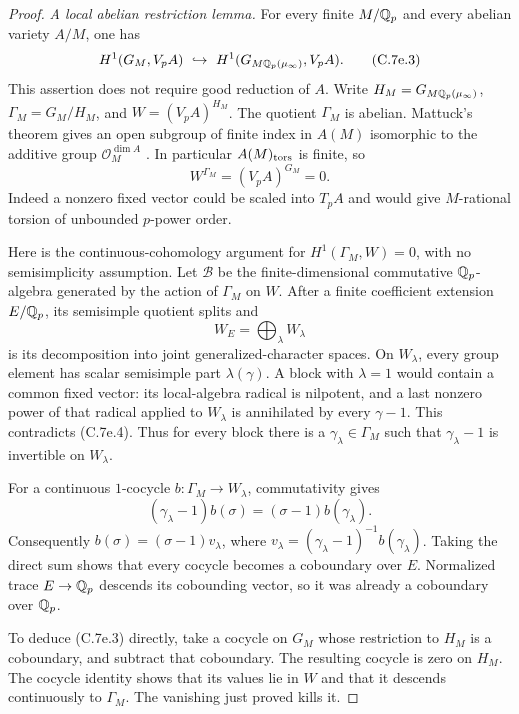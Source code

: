 \begin{proof}
\emph{A local abelian restriction lemma.}
For every finite $M/\mathbb Q_p$ and every abelian variety $A/M$, one has
\[
 H^1(G_M,V_pA)\ \hookrightarrow\
 H^1(G_{M\mathbb Q_p(\mu_\infty)},V_pA).                            \tag{C.7e.3}
\]
This assertion does not require good reduction of $A$.
Write $H_M=G_{M\mathbb Q_p(\mu_\infty)}$,
$\Gamma_M=G_M/H_M$, and $W=(V_pA)^{H_M}$.
The quotient $\Gamma_M$ is abelian. Mattuck's theorem gives an open
subgroup of finite index in $A(M)$ isomorphic to the additive group
$\mathcal O_M^{\dim A}$
\cite[Theorem~7, printed pp.~114--117]{BC_Mattuck1955}.
In particular $A(M)_{\rm tors}$ is finite, so
\[
                        W^{\Gamma_M}=(V_pA)^{G_M}=0.          \tag{C.7e.4}
\]
Indeed a nonzero fixed vector could be scaled into $T_pA$ and
would give $M$-rational torsion of unbounded $p$-power order.

Here is the continuous-cohomology argument for
$H^1(\Gamma_M,W)=0$, with no semisimplicity assumption.
Let $\mathcal B$ be the finite-dimensional commutative
$\mathbb Q_p$-algebra generated by the action of $\Gamma_M$ on $W$.
After a finite coefficient extension $E/\mathbb Q_p$, its semisimple
quotient splits and
\[
                         W_E=\bigoplus_\lambda W_\lambda
\]
is its decomposition into joint generalized-character spaces.
On $W_\lambda$, every group element has scalar semisimple
part $\lambda(\gamma)$. A block with $\lambda=1$ would contain
a common fixed vector: its local-algebra radical is nilpotent,
and a last nonzero power of that radical applied to $W_\lambda$
is annihilated by every $\gamma-1$. This contradicts (C.7e.4).
Thus for every block there is a $\gamma_\lambda\in\Gamma_M$
such that $\gamma_\lambda-1$ is invertible on $W_\lambda$.

For a continuous $1$-cocycle $b:\Gamma_M\to W_\lambda$,
commutativity gives
\[
  (\gamma_\lambda-1)b(\sigma)
                   =(\sigma-1)b(\gamma_\lambda).
\]
Consequently $b(\sigma)=(\sigma-1)v_\lambda$, where
$v_\lambda=(\gamma_\lambda-1)^{-1}b(\gamma_\lambda)$.
Taking the direct sum shows that every cocycle becomes a
coboundary over $E$. Normalized trace $E\to\mathbb Q_p$ descends its
cobounding vector, so it was already a coboundary over $\mathbb Q_p$.

To deduce (C.7e.3) directly, take a cocycle on $G_M$ whose
restriction to $H_M$ is a coboundary, and subtract that
coboundary. The resulting cocycle is zero on $H_M$.
The cocycle identity shows that its values lie in $W$ and that
it descends continuously to $\Gamma_M$. The vanishing just
proved kills it.


\end{proof}
